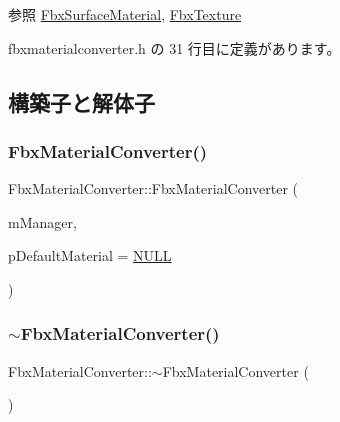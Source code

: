 \begin{DoxySeeAlso}{参照}
\hyperlink{class_fbx_surface_material}{Fbx\+Surface\+Material}, \hyperlink{class_fbx_texture}{Fbx\+Texture} 
\end{DoxySeeAlso}


 fbxmaterialconverter.\+h の 31 行目に定義があります。



\subsection{構築子と解体子}
\mbox{\label{class_fbx_material_converter_a3ad6376fa570214f45f836e4152d088a}} 
\subsubsection{\texorpdfstring{Fbx\+Material\+Converter()}{FbxMaterialConverter()}}
{\footnotesize\ttfamily Fbx\+Material\+Converter\+::\+Fbx\+Material\+Converter (\begin{DoxyParamCaption}\item[{\hyperlink{class_fbx_manager}{Fbx\+Manager} \&}]{m\+Manager,  }\item[{\hyperlink{class_fbx_surface_material}{Fbx\+Surface\+Material} $\ast$}]{p\+Default\+Material = {\ttfamily \hyperlink{fbxarch_8h_a070d2ce7b6bb7e5c05602aa8c308d0c4}{N\+U\+LL}} }\end{DoxyParamCaption})}

\mbox{\label{class_fbx_material_converter_a3941bfb660ca110cbef7d104e223e7a4}} 
\subsubsection{\texorpdfstring{$\sim$\+Fbx\+Material\+Converter()}{~FbxMaterialConverter()}}
{\footnotesize\ttfamily Fbx\+Material\+Converter\+::$\sim$\+Fbx\+Material\+Converter (\begin{DoxyParamCaption}{ }\end{DoxyParamCaption})}



